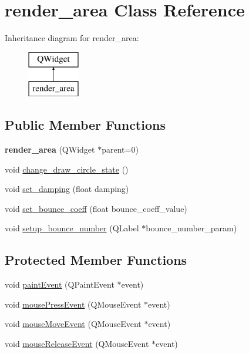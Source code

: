\hypertarget{classrender__area}{\section{render\-\_\-area Class Reference}
\label{classrender__area}
}
Inheritance diagram for render\-\_\-area\-:\begin{figure}[H]
\begin{center}
\leavevmode
\includegraphics[height=2.000000cm]{classrender__area}
\end{center}
\end{figure}
\subsection*{Public Member Functions}
\begin{DoxyCompactItemize}
\item 
\hypertarget{classrender__area_a94fbfdd96b16ac545bcc551c1fd37b8c}{{\bfseries render\-\_\-area} (Q\-Widget $\ast$parent=0)}\label{classrender__area_a94fbfdd96b16ac545bcc551c1fd37b8c}

\item 
void \hyperlink{classrender__area_a3a5d00ec1ab31659f8b5d09fbd4ac910}{change\-\_\-draw\-\_\-circle\-\_\-state} ()
\item 
void \hyperlink{classrender__area_a02d5dad4e73fe27226ca173d6fe6cbaf}{set\-\_\-damping} (float damping)
\item 
void \hyperlink{classrender__area_abfb41f3e1ea6655e643c35decf895574}{set\-\_\-bounce\-\_\-coeff} (float bounce\-\_\-coeff\-\_\-value)
\item 
void \hyperlink{classrender__area_a1a04cb64fc5e810d4c4b6d537e493c9c}{setup\-\_\-bounce\-\_\-number} (Q\-Label $\ast$bounce\-\_\-number\-\_\-param)
\end{DoxyCompactItemize}
\subsection*{Protected Member Functions}
\begin{DoxyCompactItemize}
\item 
void \hyperlink{classrender__area_a3e0c5624174bac8f62fb07fff6258a0b}{paint\-Event} (Q\-Paint\-Event $\ast$event)
\item 
void \hyperlink{classrender__area_abf4d8df609e70aa6f523836ae00dde5d}{mouse\-Press\-Event} (Q\-Mouse\-Event $\ast$event)
\item 
void \hyperlink{classrender__area_a2552b2a7f1aa521bc8ded21e5bb6e2a7}{mouse\-Move\-Event} (Q\-Mouse\-Event $\ast$event)
\item 
void \hyperlink{classrender__area_a886281d1f08072563562c943493c0d5a}{mouse\-Release\-Event} (Q\-Mouse\-Event $\ast$event)
\end{DoxyCompactItemize}


